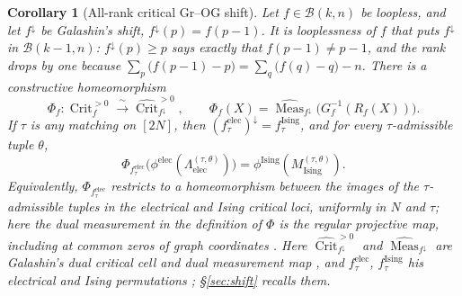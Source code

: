 \documentclass[11pt]{article}
\newtheorem{corollary}[theorem]{Corollary}
\theoremstyle{definition}
\DeclareMathOperator{\Meas}{Meas}
\DeclareMathOperator{\Crit}{Crit}
\begin{document}
\begin{corollary}[All-rank critical Gr--OG shift]\label{cor:shift}
Let $f\in\mathcal B(k,n)$ be loopless, and let $f^\downarrow$ be Galashin's shift,
$f^\downarrow(p)=f(p-1)$. It is looplessness of $f$ that puts $f^\downarrow$ in $\mathcal B(k-1,n)$:
$f^\downarrow(p)\ge p$ says exactly that $f(p-1)\ne p-1$, and the rank drops by one because
$\sum_p\bigl(f(p-1)-p\bigr)=\sum_q\bigl(f(q)-q\bigr)-n$.
There is a constructive homeomorphism
\[
 \Phi_f:\Crit_f^{>0}\xrightarrow{\ \sim\ }
 \widehat{\Crit}_{f^\downarrow}^{>0},\qquad
 \Phi_f(X)=\widehat{\Meas}_{f^\downarrow}
       \bigl(G_f^{-1}(R_f(X))\bigr).
\]
If $\tau$ is any matching on $[2N]$, then
$(f_\tau^{\mathrm{elec}})^\downarrow=f_\tau^{\mathrm{Ising}}$, and for every
$\tau$-admissible tuple $\theta$,
\[
 \Phi_{f_\tau^{\mathrm{elec}}}
 \bigl(\phi^{\mathrm{elec}}(\Lambda_{\mathrm{elec}}^{(\tau,\theta)})\bigr)
 =\phi^{\mathrm{Ising}}(M_{\mathrm{Ising}}^{(\tau,\theta)}).
\]
Equivalently, $\Phi_{f_\tau^{\mathrm{elec}}}$ restricts to a homeomorphism
between the images of the $\tau$-admissible tuples in the electrical and
Ising critical loci, uniformly in $N$ and $\tau$; here the dual measurement
in the definition of $\Phi$ is the regular projective map, including at
common zeros of graph coordinates \cite[Remark~5.3]{Galashin}.
Here $\widehat{\Crit}_{f^\downarrow}^{>0}$ and $\widehat{\Meas}_{f^\downarrow}$ are Galashin's dual
critical cell and dual measurement map \cite[\S8]{Galashin}, and $f_\tau^{\mathrm{elec}}$,
$f_\tau^{\mathrm{Ising}}$ his electrical and Ising permutations \cite[\S7]{Galashin}; \S\ref{sec:shift}
recalls them.
\end{corollary}
\end{document}
